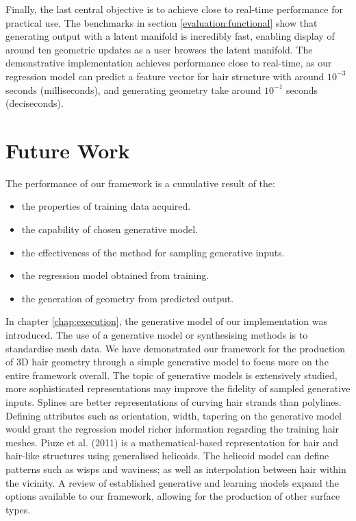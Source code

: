 \documentclass[ %
author={Dillon Keith Diep},
supervisor={Dr. Carl Henrik Ek},
degree={MEng},
title={ART-CG Hair:},
subtitle={Assisted Real-time Content Generation of Stylised Virtual Hair},
type={Research},
year={2017} ]{dissertation}
\begin{document}
Finally, the last central objective is to achieve close to real-time performance for practical use. The benchmarks in section \ref{evaluation:functional} show that generating output with a latent manifold is incredibly fast, enabling display of around ten geometric updates as a user browses the latent manifold. The demonstrative implementation achieves performance close to real-time, as our regression model can predict a feature vector for hair structure with around $10^{-3}$ seconds (milliseconds), and generating geometry take around $10^{-1}$ seconds (deciseconds).

\section{Future Work}
The performance of our framework is a cumulative result of the: 
\begin{itemize}
	\item the properties of training data acquired.
	\item the capability of chosen generative model.
	\item the effectiveness of the method for sampling generative inputs.
	\item the regression model obtained from training.
	\item the generation of geometry from predicted output.
\end{itemize}

In chapter \ref{chap:execution}, the generative model of our implementation was introduced. The use of a generative model or synthesising methods is to standardise mesh data. We have demonstrated our framework for the production of 3D hair geometry through a simple generative model to focus more on the entire framework overall.
The topic of generative models is extensively studied, more sophisticated representations may improve the fidelity of sampled generative inputs. Splines are better representations of curving hair strands than polylines. Defining attributes such as orientation, width, tapering on the generative model would grant the regression model richer information regarding the training hair meshes. Piuze et al. (2011) \cite{helicoidhair} is a mathematical-based representation for hair and hair-like structures using generalised helicoids. The helicoid model can define patterns such as wisps and waviness; as well as interpolation between hair within the vicinity. A review of established generative and learning models expand the options available to our framework, allowing for the production of other surface types.
\end{document}
